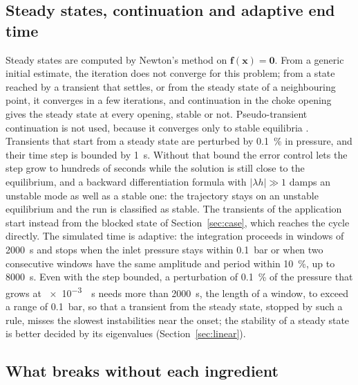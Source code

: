 \documentclass[a4paper,fleqn]{cas-sc}
\newcommand{\bx}{\mathbf{x}}
\newcommand{\bF}{\mathbf{f}}
\begin{document}
\begin{table}[htbp]
\caption{The Newton iteration of the integrator on three windows of the cycle with the choke open.}\label{tab:newton}
\footnotesize


\end{table}

\subsection{Steady states, continuation and adaptive end time}\label{sec:steady}

Steady states are computed by Newton's method on $\bF(\bx) = \mathbf{0}$. From a generic initial estimate, the iteration does not converge for this problem; from a state reached by a transient that settles, or from the steady state of a neighbouring point, it converges in a few iterations, and continuation in the choke opening gives the steady state at every opening, stable or not. Pseudo-transient continuation is not used, because it converges only to stable equilibria \citep{kelley1998}. Transients that start from a steady state are perturbed by \SI{0.1}{\percent} in pressure, and their time step is bounded by \SI{1}{\second}. Without that bound the error control lets the step grow to hundreds of seconds while the solution is still close to the equilibrium, and a backward differentiation formula with $|\lambda h| \gg 1$ damps an unstable mode as well as a stable one: the trajectory stays on an unstable equilibrium and the run is classified as stable. The transients of the application start instead from the blocked state of Section~\ref{sec:case}, which reaches the cycle directly. The simulated time is adaptive: the integration proceeds in windows of \SI{2000}{\second} and stops when the inlet pressure stays within \SI{0.1}{\bar} or when two consecutive windows have the same amplitude and period within \SI{10}{\percent}, up to \SI{8000}{\second}. Even with the step bounded, a perturbation of \SI{0.1}{\percent} of the pressure that grows at \SI{e-3}{\per\second} needs more than \SI{2000}{\second}, the length of a window, to exceed a range of \SI{0.1}{\bar}, so that a transient from the steady state, stopped by such a rule, misses the slowest instabilities near the onset; the stability of a steady state is better decided by its eigenvalues (Section~\ref{sec:linear}).

\subsection{What breaks without each ingredient}\label{sec:ablation}
\end{document}
